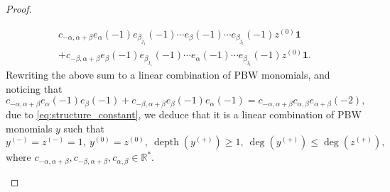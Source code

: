 \documentclass[11pt]{article}
\numberwithin{equation}{section}
\let\al\alpha
\let\be\beta
\DeclareMathOperator{\dep}{depth}
\theoremstyle{definition}
\begin{document}
\begin{proof}
\begin{itemize}
\begin{multline*}
c_{-\al,\al+\be}e_{\al}(-1)e_{\be_{j_1}}(-1) \cdots e_{\be}(-1)\cdots e_{\be_{j_t}}(-1) z^{(0)} \mathbf{1}\\
+c_{-\be,\al+\be}e_{\be}(-1)e_{\be_{j_1}}(-1) \cdots e_{\al}(-1)\cdots e_{\be_{j_t}}(-1) z^{(0)} \mathbf{1}.
\end{multline*}
Rewriting the above sum to a linear combination of PBW monomials, and noticing that
\[
c_{-\al,\al+\be}e_{\al}(-1)e_{\be}(-1)+c_{-\be,\al+\be}e_{\be}(-1)e_{\al}(-1)=c_{-\al,\al+\be}c_{\al,\be}e_{\al+\be}(-2),
\]
due to \eqref{eq:structure_constant},
we deduce that it is a linear combination of PBW monomials $y$ such that
\begin{equation}\label{e43}y^{(-)}=z^{(-)}=1, \ y^{(0)}=z^{(0)}, \ \dep(y^{(+)})\geq 1, \ \deg(y^{(+)})\leq \deg(z^{(+)}),
\end{equation}
where $c_{-\al,\al+\be}, c_{-\be,\al+\be}, c_{\al,\be}\in {\mathbb R}^*$.


\end{itemize}
\end{proof}
\end{document}
